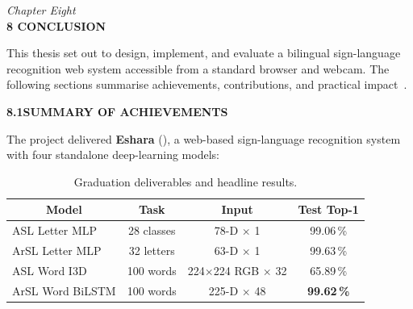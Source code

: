 \newpage
\thispagestyle{plain}

\begin{center}
    \vspace*{0.5cm}
    {\large \textit{Chapter Eight}} \\[0.4cm]
    {\Large \textbf{8 \quad CONCLUSION}}
\end{center}
\vspace{0.45in}

\normalsize
{}

\noindent This thesis set out to design, implement, and evaluate a bilingual sign-language recognition web system accessible from a standard browser and webcam. The following sections summarise achievements, contributions, and practical impact~\cite{rastgoo2021survey,zhang2020mediapipe}.\par\vspace{0.3cm}

\noindent\textbf{8.1\quad SUMMARY OF ACHIEVEMENTS}\par
{}
\vspace{0.2cm}

\noindent The project delivered \textbf{Eshara} (), a web-based sign-language recognition system with four standalone deep-learning models:

\begin{table}[H]
\centering
\caption{Graduation deliverables and headline results.}
\label{tab:ch8-summary}
\small
\begin{tabular}{|l|c|c|c|}
\hline
\multicolumn{1}{|c|}{\textbf{Model}} & \multicolumn{1}{|c|}{\textbf{Task}} & \multicolumn{1}{|c|}{\textbf{Input}} & \multicolumn{1}{|c|}{\textbf{Test Top-1}}\\
\hline
ASL Letter MLP & 28 classes & 78-D $\times$ 1 & 99.06\,\% \\
\hline
ArSL Letter MLP & 32 letters & 63-D $\times$ 1 & 99.63\,\% \\
\hline
ASL Word I3D & 100 words & 224$\times$224 RGB $\times$ 32 & 65.89\,\% \\
\hline
ArSL Word BiLSTM & 100 words & 225-D $\times$ 48 & \textbf{99.62\,\%} \\
\hline
\end{tabular}
\end{table}
\vspace{0.2cm}

